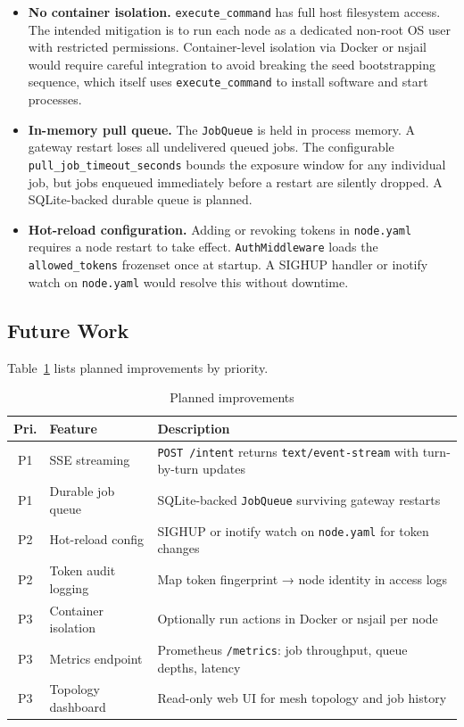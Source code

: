 \documentclass[10pt,twocolumn]{article}
\begin{document}
\begin{itemize}[noitemsep, leftmargin=12pt]
  \item \textbf{No container isolation.} \texttt{execute\_command} has
    full host filesystem access. The intended mitigation is to run each
    node as a dedicated non-root OS user with restricted permissions.
    Container-level isolation via Docker or nsjail would require
    careful integration to avoid breaking the seed bootstrapping
    sequence, which itself uses \texttt{execute\_command} to install
    software and start processes.

  \item \textbf{In-memory pull queue.} The \texttt{JobQueue} is held
    in process memory. A gateway restart loses all undelivered queued
    jobs. The configurable \texttt{pull\_job\_timeout\_seconds} bounds
    the exposure window for any individual job, but jobs enqueued
    immediately before a restart are silently dropped. A SQLite-backed
    durable queue is planned.

  \item \textbf{Hot-reload configuration.} Adding or revoking tokens
    in \texttt{node.yaml} requires a node restart to take effect.
    \texttt{AuthMiddleware} loads the \texttt{allowed\_tokens}
    frozenset once at startup. A SIGHUP handler or inotify watch on
    \texttt{node.yaml} would resolve this without downtime.
\end{itemize}

\subsection{Future Work}

Table~\ref{tab:futurework} lists planned improvements by priority.

\begin{table}[tp]
\centering
\caption{Planned improvements}
\label{tab:futurework}
\small
\begin{tabular}{@{}clp{4.2cm}@{}}
\toprule
\textbf{Pri.} & \textbf{Feature} & \textbf{Description} \\
\midrule
P1 & SSE streaming & \texttt{POST /intent} returns \texttt{text/event-stream} with turn-by-turn updates \\
P1 & Durable job queue & SQLite-backed \texttt{JobQueue} surviving gateway restarts \\
P2 & Hot-reload config & SIGHUP or inotify watch on \texttt{node.yaml} for token changes \\
P2 & Token audit logging & Map token fingerprint → node identity in access logs \\
P3 & Container isolation & Optionally run actions in Docker or nsjail per node \\
P3 & Metrics endpoint & Prometheus \texttt{/metrics}: job throughput, queue depths, latency \\
P3 & Topology dashboard & Read-only web UI for mesh topology and job history \\
\bottomrule
\end{tabular}
\end{table}
\end{document}
